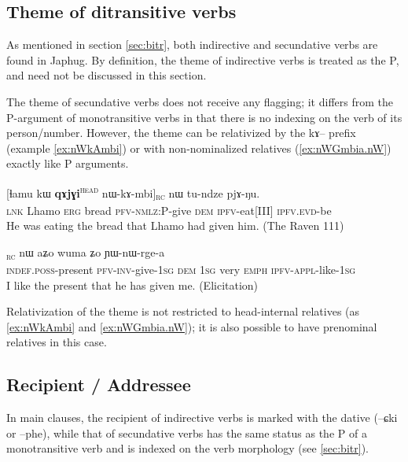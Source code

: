 \documentclass[oldfontcommands,oneside,a4paper,11pt]{article}
\newcommand{\ipa}[1]{{\phon #1}} %
\newcommand{\topic}{\textsc{dem}}
\newcommand{\tete}{\textsuperscript{\textsc{head}}}
\newcommand{\rc}{\textsubscript{\textsc{rc}}}
\begin{document}
\subsection{Theme of ditransitive verbs}  \label{sec:second}
As mentioned in section \ref{sec:bitr}, both indirective and secundative verbs are found in Japhug. By definition, the theme of indirective verbs is treated as the P, and need not be discussed in this section.

The theme of secundative verbs does not receive  any flagging; it differs from the P-argument of monotransitive verbs in that there is no indexing on the verb of its person/number. However, the theme can be relativized by the \ipa{kɤ}-- prefix (example \ref{ex:nWkAmbi}) or with non-nominalized relatives (\ref{ex:nWGmbia.nW}) exactly like P arguments.

\begin{exe}
\ex \label{ex:nWkAmbi}
\gll      \ipa{tɕe} 	[\ipa{ɬamu} 	\ipa{kɯ} 	\textbf{\ipa{qɤjɣi}}\tete{} 	\ipa{nɯ-kɤ-mbi}]\rc{} 	\ipa{nɯ} 	\ipa{tu-ndze} 	\ipa{pjɤ-ŋu.}   \\
\textsc{lnk} Lhamo \textsc{erg} bread \textsc{pfv-nmlz}:P-give \topic{} \textsc{ipfv}-eat[III] \textsc{ipfv.evd}-be  \\
 \glt    He was eating the bread that Lhamo had given him. (The Raven 111)
\end{exe} 

      \begin{exe}
   \ex \label{ex:nWGmbia.nW}
 \gll  [\ipa{tɤ-pɤro}\tete{}  	\ipa{nɯ́-wɣ-mbi-a}]\rc{}  	\ipa{nɯ}  	\ipa{aʑo}  	\ipa{wuma}  	\ipa{ʑo}  	\ipa{ɲɯ-nɯ-rge-a}  	 \\
 \textsc{indef.poss}-present \textsc{pfv-inv}-give-\textsc{1sg} \topic{} \textsc{1sg} very \textsc{emph} \textsc{ipfv-appl}-like-\textsc{1sg}   \\
\glt  I like the present that he has given me. (Elicitation)
\end{exe}


Relativization of the theme is not restricted to head-internal relatives  (as  \ref{ex:nWkAmbi} and \ref{ex:nWGmbia.nW}); it is also possible to have prenominal relatives in this case.

\subsection{Recipient / Addressee}

In main clauses, the recipient of indirective verbs is marked with the dative (\ipa{--ɕki} or \ipa{--phe}), while that of secundative verbs has the same status as the P of a monotransitive verb and is indexed on the verb morphology (see \ref{sec:bitr}).
\end{document}
